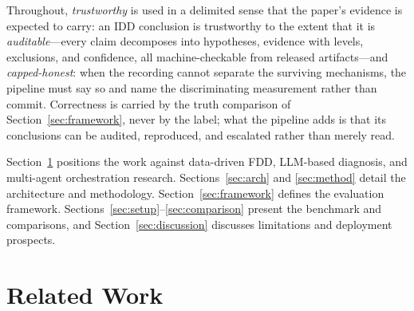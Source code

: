 \documentclass[preprint,10pt]{elsarticle}
\begin{document}
Throughout, \emph{trustworthy} is used in a delimited sense that the paper's evidence is expected to carry: an IDD conclusion is trustworthy to the extent that it is \emph{auditable}---every claim decomposes into hypotheses, evidence with levels, exclusions, and confidence, all machine-checkable from released artifacts---and \emph{capped-honest}: when the recording cannot separate the surviving mechanisms, the pipeline must say so and name the discriminating measurement rather than commit. Correctness is carried by the truth comparison of Section~\ref{sec:framework}, never by the label; what the pipeline adds is that its conclusions can be audited, reproduced, and escalated rather than merely read.

Section~\ref{sec:related} positions the work against data-driven FDD, LLM-based diagnosis, and multi-agent orchestration research. Sections~\ref{sec:arch} and \ref{sec:method} detail the architecture and methodology. Section~\ref{sec:framework} defines the evaluation framework. Sections~\ref{sec:setup}--\ref{sec:comparison} present the benchmark and comparisons, and Section~\ref{sec:discussion} discusses limitations and deployment prospects.

\section{Related Work}
\label{sec:related}
\end{document}
